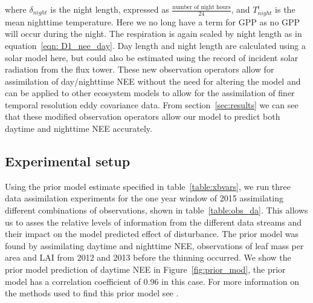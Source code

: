 \documentclass[draft,linenumbers]{agujournal}
\begin{document}
where \(\delta_{night}\) is the night length, expressed as \(\frac{\text{number of night hours}}{24}\), and \(T_{night}^{i}\) is the mean nighttime temperature. Here we no long have a term for GPP as no GPP will occur during the night. The respiration is again scaled by night length as in equation~\eqref{eqn: D1_nee_day}. Day length and night length are calculated using a solar model here, but could also be estimated using the record of incident solar radiation from the flux tower. These new observation operators allow for assimilation of day/nighttime NEE without the need for altering the model and can be applied to other ecosystem models to allow for the assimilation of finer temporal resolution eddy covariance data. From section~\ref{sec:results} we can see that these modified observation operators allow our model to predict both daytime and nighttime NEE accurately.


\subsection{Experimental setup}


Using the prior model estimate specified in table~\ref{table:xbvars}, we run three data assimilation experiments for the one year window of 2015 assimilating different combinations of observations, shown in table~\ref{table:obs_da}. This allows us to asses the relative levels of information from the different data streams and their impact on the model predicted effect of disturbance. The prior model was found by assimilating daytime and nighttime NEE, observations of leaf mass per area and LAI from 2012 and 2013 before the thinning occurred. We show the prior model prediction of daytime NEE in Figure~\ref{fig:prior_mod}, the prior model has a correlation coefficient of 0.96 in this case. For more information on the methods used to find this prior model see \citet{Pinnington2016299}.   
\end{document}
